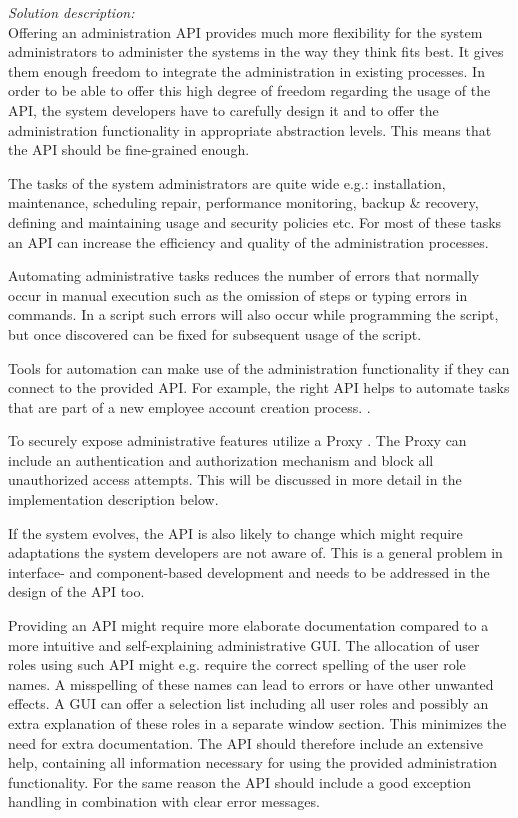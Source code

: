 \textit{Solution description:}\\ 
Offering an administration API provides much more flexibility for the system administrators to administer the systems in the way they think fits best. It gives them enough freedom to integrate the administration in existing processes. In order to be able to offer this high degree of freedom regarding the usage of the API, the system developers have to carefully design it and to offer the administration functionality in appropriate abstraction levels. This means that the API should be fine-grained enough.

The tasks of the system administrators are quite wide e.g.: installation, maintenance, scheduling repair, performance monitoring, backup \& recovery, defining and maintaining usage and security policies etc. For most of these tasks an API can increase the efficiency and quality of the administration processes. 

Automating administrative tasks reduces the number of errors that normally occur in manual execution such as the omission of steps or typing errors in commands. In a script such errors will also occur while programming the script, but once discovered can be fixed for subsequent usage of the script.

Tools for automation can make use of the administration functionality if they can connect to the provided API. For example, the right API helps to automate tasks that are part of a new employee account creation process. \cite{Limoncelli2011a}.

To securely expose administrative features utilize a {\sc Proxy} \cite{Buschmann1996}. The {\sc Proxy} can include an authentication and authorization mechanism and block all unauthorized access attempts. This will be discussed in more detail in the implementation description below.

If the system evolves, the API is also likely to change which might require adaptations the system developers are not aware of. This is a general problem in interface- and component-based development and needs to be addressed in the design of the API too. 

Providing an API might require more elaborate documentation compared to a more intuitive and self-explaining administrative GUI. The allocation of user roles using such API might e.g. require the correct spelling of the user role names. A misspelling of these names can lead to errors or have other unwanted effects. A GUI can offer a selection list including all user roles and possibly an extra explanation of these roles in a separate window section. 
This minimizes the need for extra documentation. The API should therefore include an extensive help, containing all information necessary for using the provided administration functionality. For the same reason the API should include a good exception handling in combination with clear error messages.\\

